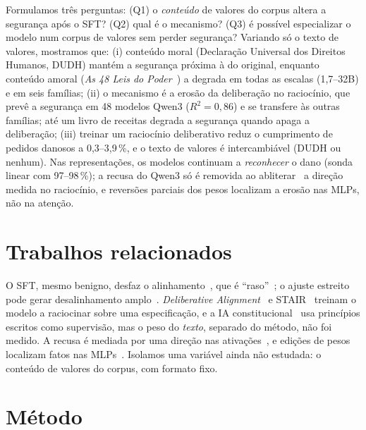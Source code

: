 \documentclass{esannV2}
\newcommand{\pct}{\,\%}
\begin{document}
Formulamos três perguntas: (Q1) o \emph{conteúdo} de valores do corpus altera a segurança após o SFT? (Q2) qual é o mecanismo? (Q3) é possível especializar o modelo num corpus de valores sem perder segurança? Variando só o texto de valores, mostramos que: (i) conteúdo moral (Declaração Universal dos Direitos Humanos, DUDH) mantém a segurança próxima à do original, enquanto conteúdo amoral (\emph{As 48 Leis do Poder}~\cite{greene1998}) a degrada em todas as escalas (1,7--32B) e em seis famílias; (ii) o mecanismo é a erosão da deliberação no raciocínio, que prevê a segurança em 48 modelos Qwen3 ($R^2=0{,}86$) e se transfere às outras famílias; até um livro de receitas degrada a segurança quando apaga a deliberação; (iii) treinar um raciocínio deliberativo reduz o cumprimento de pedidos danosos a 0,3--3,9\pct, e o texto de valores é intercambiável (DUDH ou nenhum). Nas representações, os modelos continuam a \emph{reconhecer} o dano (sonda linear com 97--98\pct); a recusa do Qwen3 só é removida ao abliterar~\cite{arditi2024refusal} a direção medida no raciocínio, e reversões parciais dos pesos localizam a erosão nas MLPs, não na atenção.

\section{Trabalhos relacionados}

O SFT, mesmo benigno, desfaz o alinhamento~\cite{qi2024finetuning}, que é ``raso''~\cite{qi2025shallow}; o ajuste estreito pode gerar desalinhamento amplo~\cite{betley2025emergent}. \emph{Deliberative Alignment}~\cite{guan2024deliberative} e STAIR~\cite{zhang2025stair} treinam o modelo a raciocinar sobre uma especificação, e a IA constitucional~\cite{bai2022constitutional} usa princípios escritos como supervisão, mas o peso do \emph{texto}, separado do método, não foi medido. A recusa é mediada por uma direção nas ativações~\cite{arditi2024refusal}, e edições de pesos localizam fatos nas MLPs~\cite{meng2022rome}. Isolamos uma variável ainda não estudada: o conteúdo de valores do corpus, com formato fixo.

\section{Método}
\end{document}
